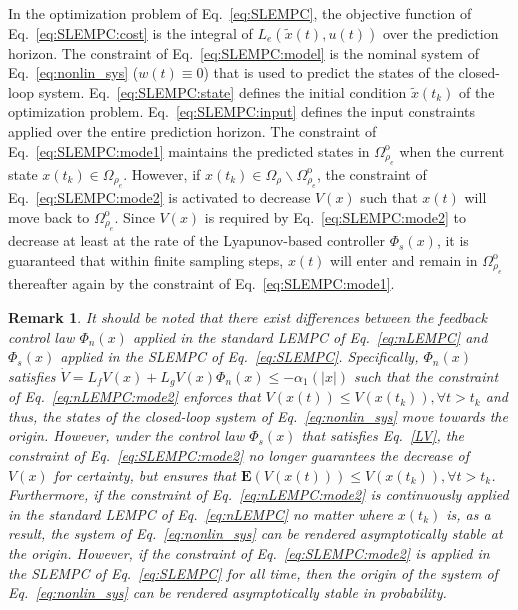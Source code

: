 \documentclass[letterpaper, 10pt, conference]{ieeeconf}
\newtheorem{rmk}{Remark}
\begin{document}
	In the optimization problem of Eq.~\ref{eq:SLEMPC}, the objective function of Eq.~\ref{eq:SLEMPC:cost} is the integral of $L_e(\tilde{x}(t), u(t))$ over the prediction horizon. The constraint of Eq.~\ref{eq:SLEMPC:model} is the nominal system of Eq.~\ref{eq:nonlin_sys} ($w(t) \equiv 0$) that is used to predict the states of the closed-loop system. Eq.~\ref{eq:SLEMPC:state} defines the initial condition $\tilde{x}(t_k)$ of the optimization problem. Eq.~\ref{eq:SLEMPC:input} defines the input constraints applied over the entire prediction horizon. The constraint of Eq.~\ref{eq:SLEMPC:mode1} maintains the predicted states in $\Omega_{\rho_e}^{\text{o}}$ when the current state $x(t_k) \in \Omega_{\rho_e}$. However, if $x(t_k) \in \Omega_{\rho} \backslash \Omega_{\rho_e}^{\text{o}}$, the constraint of Eq.~\ref{eq:SLEMPC:mode2} is activated to decrease $V(x)$ such that $x(t)$ will move back to $\Omega_{\rho_e}^{\text{o}}$. Since $V(x)$ is required by Eq.~\ref{eq:SLEMPC:mode2} to decrease at least at the rate of the Lyapunov-based controller $\Phi_s(x)$, it is guaranteed that within finite sampling steps, $x(t)$ will enter and remain in $\Omega_{\rho_e}^{\text{o}}$ thereafter again by the constraint of Eq.~\ref{eq:SLEMPC:mode1}.

\begin{rmk}
	It should be noted that there exist differences between the feedback control law $\Phi_n(x)$ applied in the standard LEMPC of Eq.~\ref{eq:nLEMPC} and $\Phi_s(x)$ applied in the SLEMPC of Eq.~\ref{eq:SLEMPC}. Specifically, $\Phi_n(x)$ satisfies $\dot{V}=L_fV(x)+L_gV(x) \Phi_n(x) \leq -\alpha_1(\vert x \vert)$ such that the constraint of Eq.~\ref{eq:nLEMPC:mode2} enforces that $V(x(t)) \leq V(x(t_k)), \forall t> t_k$ and thus, the states of the closed-loop system of Eq.~\ref{eq:nonlin_sys} move towards the origin. However, under the control law $\Phi_s(x)$ that satisfies Eq.~\ref{LV}, the constraint of Eq.~\ref{eq:SLEMPC:mode2} no longer guarantees the decrease of $V(x)$ for certainty, but ensures that $\mathbf{E}(V(x(t))) \leq V(x(t_k)), \forall t> t_k$. Furthermore, if the constraint of Eq.~\ref{eq:nLEMPC:mode2} is continuously applied in the standard LEMPC of Eq.~\ref{eq:nLEMPC} no matter where $x(t_k)$ is, as a result, the system of Eq.~\ref{eq:nonlin_sys} can be rendered asymptotically stable at the origin. However, if the constraint of Eq.~\ref{eq:SLEMPC:mode2} is applied in the SLEMPC of Eq.~\ref{eq:SLEMPC} for all time, then the origin of the system of Eq.~\ref{eq:nonlin_sys} can be rendered asymptotically stable in probability.
\end{rmk}
\end{document}
